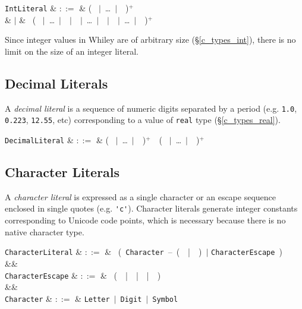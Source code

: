 \begin{syntax}
  \verb+IntLiteral+ & $::=$ & \big( \ $|$\ \ldots\ $|$\ \ \big)$^+$ \\
  & $|$ &  \ \big( \ $|$\ \ldots\ $|$\ \ $|$\ \ $|$\ \ldots\ $|$\ \ $|$\ \ $|$\ \ldots\ $|$\ \ \big)$^+$\\
\end{syntax}

Since integer values in Whiley are of arbitrary size (\S\ref{c_types_int}), there is no limit on the size of an integer literal.

\subsection{Decimal Literals}

A {\em decimal literal} is a sequence of numeric digits separated by a period (e.g. \lstinline{1.0}, \lstinline{0.223}, \lstinline{12.55}, etc) corresponding to a value of \lstinline{real} type (\S\ref{c_types_real}).

\begin{syntax}
  \verb+DecimalLiteral+ & $::=$ & \big( \ $|$\ \ldots\ $|$\ \ \big)$^+$\ \ \big( \ $|$\ \ldots\ $|$\ \ \big)$^+$ \\
\end{syntax}

\subsection{Character Literals}

A {\em character literal} is expressed as a single character or an escape sequence enclosed in single quotes (e.g. \lstinline{'c'}).  Character literals generate integer constants corresponding to Unicode code points, which is necessary because there is no native character type.

\begin{syntax}
  \verb+CharacterLiteral+ & $::=$ & \ \Big(\ \verb+Character+\ --\ \big(\ \token{\textbackslash}\ |\ \ \big)\ $|$ \verb+CharacterEscape+\ \Big)\  \\
  &&\\
  \verb+CharacterEscape+ & $::=$ & \token{\textbackslash}\ \big(\ \token{\textbackslash}\ |\ \ |\ \ |\ \ \big)\\
  &&\\
  \verb+Character+ & $::=$ & \verb+Letter+\ $|$\ \verb+Digit+\ $|$\ \verb+Symbol+\\

\end{syntax}

